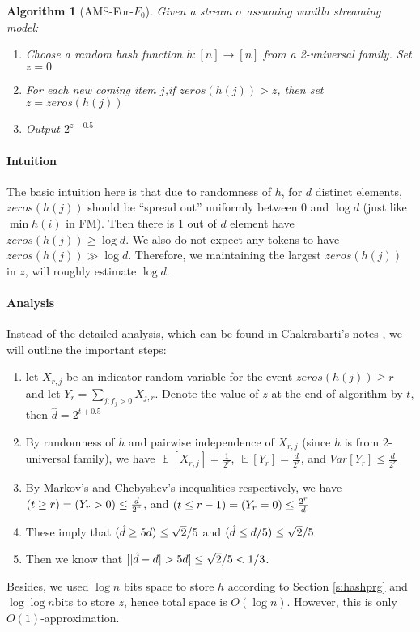 \documentclass[11pt]{article}
\theoremstyle{plain}
\newtheorem{algorithm}{Algorithm}[section]
\DeclareMathOperator*{\E}{\mathbb{E}}
\let\Pr\relax
\DeclareMathOperator*{\Pr}{\mathbb{P}}
\begin{document}
\begin{algorithm}[AMS-For-$F_0$] Given a stream $\sigma$ assuming 
vanilla streaming model: 
\label{al:amsf0}
	\begin{enumerate}
		\item Choose a random hash function $h : [n] \rightarrow[n]$ from a 
		2-universal family. Set $z = 0$
		\item For each new coming item $j$,if $zeros(h(j)) > z$, 
		then set $z = zeros(h(j))$
		\item Output $2^{z+0.5}$
	\end{enumerate}
\end{algorithm}

\paragraph{Intuition}The basic intuition here is that due to randomness of 
$h$, for $d$ distinct elements, $zeros(h(j))$ should be ``spread out'' 
uniformly between 0 and $\log d$ (just like $\min h(i)$ in FM). Then there is 1 
out of $d$ element have $zeros(h(j))\geq\log d$. We also do not expect any 
tokens to have $zeros(h(j))\gg\log d$. Therefore, we maintaining the largest  
$zeros(h(j))$ in $z$, will roughly estimate $\log d$. 

\paragraph{Analysis} Instead of the detailed analysis, which can be found in 
Chakrabarti's notes  \cite{Cha2015-notes}, we will outline the important 
steps: 
\begin{enumerate}
	\item let $X_{r,j}$ be an indicator random variable for the event 
	$zeros(h(j))\geq r$ and let $Y_r = \sum_{j:f_j>0}X_{j,r}$. Denote the value 
	of $z$ at the end of algorithm by $t$, then $\hat{d}=2^{t+0.5}$
	\item By randomness of $h$ and pairwise independence of $X_{r,j}$ (since 
	$h$ is from 2-universal family), we have 
	$\E[X_{r,j}]=\frac{1}{2^r}$, 
	$\E[Y_{r}]=\frac{d}{2^r}$, 
	and $Var[Y_{r}]\leq\frac{d}{2^r}$
	\item By Markov’s and Chebyshev’s inequalities respectively, we have 
	$\Pr(t\geq r)=\Pr(Y_r>0)\leq\frac{d}{2^r}$,  and $\Pr(t\leq 
	r-1)=\Pr(Y_r=0)\leq\frac{2^r}{d}$
	\item These imply that $\Pr(\hat{d}\geq5d)\leq \sqrt{2}/5$ and  
	$\Pr(\hat{d}\leq d/5)\leq \sqrt{2}/5$ 
	\item Then we know that 
	$\Pr[|\hat{d}-d|>5d]\leq \sqrt{2}/5<1/3$. 
\end{enumerate}
Besides, we used $\log n$ bits space to store $h$ according to 
Section  \ref{s:hashprg} and $\log\log n $bits to store $z$, hence total space 
is $O(\log n)$. However, this is only $O(1)$-approximation. 
\end{document}
